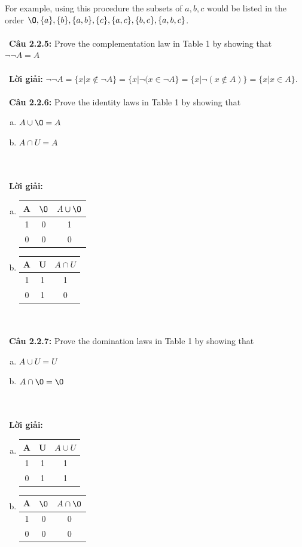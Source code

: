 \documentclass[a4paper]{article}
\begin{document}
For example, using this procedure the subsets of ${a,b,c}$ would be listed in the order $\O ,\{a\},\{b\},\{a,b\},\{c\},\{a,c\},\{b,c\},\{a,b,c\}$.  \\\ \\\
\textbf{Câu 2.2.5: }  Prove the complementation law in Table 1 by showing that $\lnot \lnot A = A$ \\\ \\\
\textbf{Lời giải:} $\lnot \lnot A=\{x|x \notin \lnot A\}=\{x|\lnot (x \in \lnot A\}=\{x|\lnot (x \notin A)\}=\{x|x \in A\}$. \\\ \\\
\textbf{Câu 2.2.6: } Prove the identity laws in Table 1 by showing that
\begin{enumerate}[a)]
\item $A \cup \O = A$
\item $A \cap U = A$
\end{enumerate} \\\ \\\
\textbf{Lời giải:} \begin{enumerate}[a)]
\item \begin{tabular}{|c|c|c|}
\hline 
A & $\O$ & $A \cup \O$ \\ 
\hline 
1 & 0 & 1 \\ 
\hline 
0 & 0 & 0 \\ 
\hline 
\end{tabular} 
\item \begin{tabular}{|c|c|c|}
\hline 
A & U & $A \cap U$ \\ 
\hline 
1 & 1 & 1 \\ 
\hline 
0 & 1 & 0 \\ 
\hline 
\end{tabular} 
\end{enumerate} \\\ \\\
\textbf{Câu 2.2.7: }  Prove the domination laws in Table 1 by showing that
\begin{enumerate}[a)]
\item $A \cup U = U$
\item $A \cap \O = \O$
\end{enumerate} \\\ \\\
\textbf{Lời giải:} \begin{enumerate}[a)]
\item \begin{tabular}{|c|c|c|}
\hline 
A & U & $A \cup U$ \\ 
\hline 
1 & 1 & 1 \\ 
\hline 
0 & 1 & 1 \\ 
\hline 
\end{tabular} 
\item \begin{tabular}{|c|c|c|}
\hline 
A & $\O$ & $A \cap \O$ \\ 
\hline 
1 & 0 & 0 \\ 
\hline 
0 & 0 & 0 \\ 
\hline 
\end{tabular} 
\end{enumerate} \\\ \\\
\end{document}
